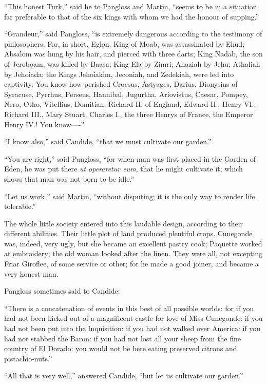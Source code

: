 ``This honest Turk,'' said he to Pangloss and Martin, ``seems to be in a situation far preferable to that of the six kings with whom we had the honour of supping.''

``Grandeur,'' said Pangloss, ``is extremely dangerous according to the testimony of philosophers. For, in short, Eglon, King of Moab, was assassinated by Ehud; Absalom was hung by his hair, and pierced with three darts; King Nadab, the son of Jeroboam, was killed by Baasa; King Ela by Zimri; Ahaziah by Jehu; Athaliah by Jehoiada; the Kings Jehoiakim, Jeconiah, and Zedekiah, were led into captivity. You know how perished Croesus, Astyages, Darius, Dionysius of Syracuse, Pyrrhus, Perseus, Hannibal, Jugurtha, Ariovistus, Caesar, Pompey, Nero, Otho, Vitellius, Domitian, Richard II. of England, Edward II., Henry VI., Richard III., Mary Stuart, Charles I., the three Henrys of France, the Emperor Henry IV.! You know----''

``I know also,'' said Candide, ``that we must cultivate our garden.''

``You are right,'' said Pangloss, ``for when man was first placed in the Garden of Eden, he was put there \textit{ut operaretur eum}, that he might cultivate it; which shows that man was not born to be idle.''

``Let us work,'' said Martin, ``without disputing; it is the only way to render life tolerable.''

The whole little society entered into this laudable design, according to their different abilities. Their little plot of land produced plentiful crops. Cunegonde was, indeed, very ugly, but she became an excellent pastry cook; Paquette worked at embroidery; the old woman looked after the linen. They were all, not excepting Friar Giroflee, of some service or other; for he made a good joiner, and became a very honest man.

Pangloss sometimes said to Candide:

``There is a concatenation of events in this best of all possible worlds: for if you had not been kicked out of a magnificent castle for love of Miss Cunegonde: if you had not been put into the Inquisition: if you had not walked over America: if you had not stabbed the Baron: if you had not lost all your sheep from the fine country of El Dorado: you would not be here eating preserved citrons and pistachio-nuts.''

``All that is very well,'' answered Candide, ``but let us cultivate our garden.''

